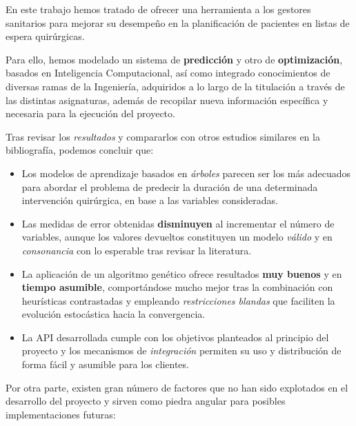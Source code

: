 
En este trabajo hemos tratado de ofrecer una herramienta a los gestores sanitarios para mejorar su desempeño en la planificación de pacientes en listas de espera quirúrgicas.

Para ello, hemos modelado un sistema de \textbf{predicción} y otro de \textbf{optimización}, basados en Inteligencia Computacional, así como integrado conocimientos de diversas ramas de la Ingeniería, adquiridos a lo largo de la titulación a través de las distintas asignaturas, además de recopilar nueva información específica y necesaria para la ejecución del proyecto.

Tras revisar los \textit{resultados} y compararlos con otros estudios similares en la bibliografía, podemos concluir que:

\begin{itemize}
    \item Los modelos de aprendizaje basados en \textit{árboles} parecen ser los más adecuados para abordar el problema de predecir la duración de una determinada intervención quirúrgica, en base a las variables consideradas.
    \item Las medidas de error obtenidas \textbf{disminuyen} al incrementar el número de variables, aunque los valores devueltos constituyen un modelo \textit{válido} y en \textit{consonancia} con lo esperable tras revisar la literatura.
    \item La aplicación de un algoritmo genético ofrece resultados \textbf{muy buenos} y en \textbf{tiempo asumible}, comportándose mucho mejor tras la combinación con heurísticas contrastadas y empleando \textit{restricciones blandas} que faciliten la evolución estocástica hacia la convergencia.
    \item La API desarrollada cumple con los objetivos planteados al principio del proyecto y los mecanismos de \textit{integración} permiten su uso y distribución de forma fácil y asumible para los clientes.
\end{itemize}

Por otra parte, existen gran número de factores que no han sido explotados en el desarrollo del proyecto y sirven como piedra angular para posibles implementaciones futuras:

